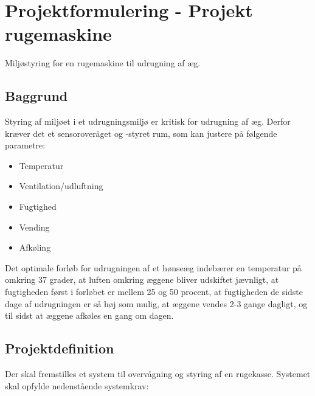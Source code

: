 \section{Projektformulering - Projekt rugemaskine}

Miljøstyring for en rugemaskine til udrugning af æg.

\subsection{Baggrund}

Styring af miljøet i et udrugningsmiljø er kritisk for udrugning af æg. Derfor kræver det et sensoroveråget og -styret rum, som kan justere på følgende parametre:

\begin{itemize}
\item Temperatur
\item Ventilation/udluftning
\item Fugtighed
\item Vending
\item Afkøling
\end{itemize}

Det optimale forløb for udrugningen af et hønseæg indebærer en temperatur på omkring 37 grader, at luften omkring æggene bliver udskiftet jævnligt, at fugtigheden først i forløbet er mellem 25 og 50 procent, at fugtigheden de sidste dage af udrugningen er så høj som mulig, at æggene vendes 2-3 gange dagligt, og til sidst at æggene afkøles en gang om dagen.

\subsection{Projektdefinition}
Der skal fremstilles et system til overvågning og styring af en rugekasse. Systemet skal opfylde nedenstående systemkrav:

